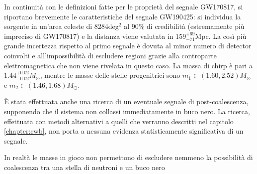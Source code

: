 In continuità con le definizioni fatte per le proprietà del segnale GW170817, si riportano brevemente le caratteristiche del segnale GW190425: si individua la sorgente in un'area celeste di 8284deg$^2$ al 90\% di credibilità (estremamente più impreciso di GW170817) e la distanza viene valutata in $159_{-71}^{+69}$Mpc. La così più grande incertezza rispetto al primo segnale è dovuta al minor numero di detector coinvolti e all'impossibilità di escludere regioni grazie alla controparte elettromagnetica che non viene rivelata in questo caso.
La massa di chirp è pari a $1.44^{+0.02}_{-0.02}M_\odot$, mentre le masse delle stelle progenitrici sono $m_1 \in (1.60, 2.52)M_\odot$ e $m_2 \in (1.46, 1.68)M_\odot$\cite{Abbott_2020b}.

È stata effettuata anche una ricerca di un eventuale segnale di post-coalescenza, supponendo che il sistema non collassi immediatamente in buco nero. La ricerca, effettuata con metodi alternativi a quelli che verranno descritti nel capitolo \ref{chapter:cwb}, non porta a nessuna evidenza statisticamente significativa di un segnale\cite{Abbott_2020b}.

In realtà le masse in gioco non permettono di escludere nemmeno la possibilità di coalescenza tra una stella di neutroni e un buco nero \cite{Han_2020}
